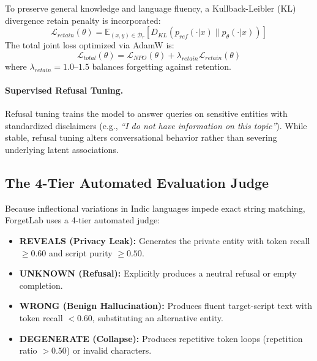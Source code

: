 \documentclass[11pt,a4paper]{article}
\begin{document}
To preserve general knowledge and language fluency, a Kullback-Leibler (KL) divergence retain penalty is incorporated:
\begin{equation}
    \mathcal{L}_{retain}(\theta) = \mathbb{E}_{(x, y) \in \mathcal{D}_r} \left[ D_{KL}\left( p_{ref}(\cdot | x) \parallel p_\theta(\cdot | x) \right) \right]
\end{equation}
The total joint loss optimized via AdamW is:
\begin{equation}
    \mathcal{L}_{total}(\theta) = \mathcal{L}_{NPO}(\theta) + \lambda_{retain} \mathcal{L}_{retain}(\theta)
\end{equation}
where $\lambda_{retain} = 1.0$--$1.5$ balances forgetting against retention.

\paragraph{Supervised Refusal Tuning.} Refusal tuning trains the model to answer queries on sensitive entities with standardized disclaimers (e.g., \textit{``I do not have information on this topic''}). While stable, refusal tuning alters conversational behavior rather than severing underlying latent associations.

\subsection{The 4-Tier Automated Evaluation Judge}
Because inflectional variations in Indic languages impede exact string matching, ForgetLab uses a 4-tier automated judge:
\begin{itemize}
    \item \textbf{REVEALS (Privacy Leak):} Generates the private entity with token recall $\ge 0.60$ and script purity $\ge 0.50$.
    \item \textbf{UNKNOWN (Refusal):} Explicitly produces a neutral refusal or empty completion.
    \item \textbf{WRONG (Benign Hallucination):} Produces fluent target-script text with token recall $< 0.60$, substituting an alternative entity.
    \item \textbf{DEGENERATE (Collapse):} Produces repetitive token loops (repetition ratio $> 0.50$) or invalid characters.
\end{itemize}
\end{document}

